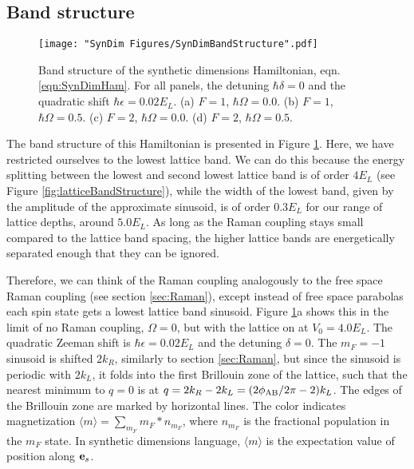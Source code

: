 \subsection{Band structure}\label{sec:SynDimBandStructure}
\begin{figure}
	\texttt{[image: "SynDim Figures/SynDimBandStructure".pdf]}
\caption{Band structure of the synthetic dimensions Hamiltonian, eqn. \ref{eqn:SynDimHam}. For all panels, the detuning $\hbar\delta=0$ and the quadratic shift $\hbar\epsilon=0.02 E_L$. (a) $F=1$, $\hbar\Omega=0.0$. (b) $F=1$, $\hbar\Omega=0.5$. (c) $F=2$, $\hbar\Omega=0.0$. (d) $F=2$, $\hbar\Omega=0.5$. }
\label{fig:SynDimBandStruct}
\end{figure}

The band structure of this Hamiltonian is presented in Figure \ref{fig:SynDimBandStruct}. Here, we have restricted ourselves to the lowest lattice band. We can do this because the energy splitting between the lowest and second lowest lattice band is of order $4 E_L$ (see Figure \ref{fig:latticeBandStructure}), while the width of the lowest band, given by the amplitude of the approximate sinusoid, is of order $0.3 E_L$ for our range of lattice depths, around $5.0 E_L$. As long as the Raman coupling stays small compared to the lattice band spacing, the higher lattice bands are energetically separated enough that they can be ignored. 

Therefore, we can think of the Raman coupling analogously to the free space Raman coupling (see section \ref{sec:Raman}), except instead of free space parabolas each spin state gets a lowest lattice band sinusoid.   Figure \ref{fig:SynDimBandStruct}a shows this in the limit of no Raman coupling, $\Omega=0$, but with the lattice on at $V_0=4.0 E_L$. The quadratic Zeeman shift is $\hbar\epsilon=0.02 E_L$ and the detuning $\delta=0$. The $m_F=-1$ sinusoid is shifted $2k_R$, similarly to section \ref{sec:Raman}, but since the sinusoid is periodic with $2k_L$, it folds into the first Brillouin zone of the lattice, such that the nearest minimum to $q=0$ is at $q = 2k_R-2k_L = (2\phi_{\rm AB}/2\pi - 2)k_L$. The edges of the Brillouin zone are marked by horizontal lines. The color indicates magnetization $\langle m\rangle=\sum_{m_F}m_F*n_{m_F}$, where $n_{m_F}$ is the fractional population in the $m_F$ state. In synthetic dimensions language, $\langle m \rangle$ is the expectation value of position along ${\bf e}_s$.

